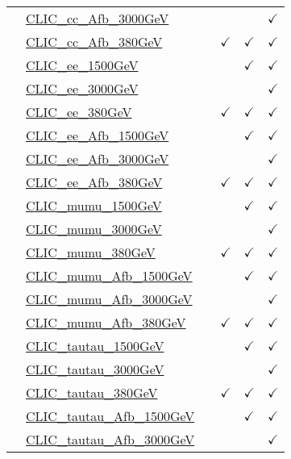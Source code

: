 \documentclass{article}
\begin{document}
\begin{longtable}{|c|l|c|c|c|c|}
 & \href{https://arxiv.org}{CLIC_cc_Afb_3000GeV}  &  &  &  & $\checkmark$\\ \cline{2-6}
 & \href{https://arxiv.org}{CLIC_cc_Afb_380GeV}  &  & $\checkmark$ & $\checkmark$ & $\checkmark$\\ \cline{2-6}
 & \href{https://arxiv.org}{CLIC_ee_1500GeV}  &  &  & $\checkmark$ & $\checkmark$\\ \cline{2-6}
 & \href{https://arxiv.org}{CLIC_ee_3000GeV}  &  &  &  & $\checkmark$\\ \cline{2-6}
 & \href{https://arxiv.org}{CLIC_ee_380GeV}  &  & $\checkmark$ & $\checkmark$ & $\checkmark$\\ \cline{2-6}
 & \href{https://arxiv.org}{CLIC_ee_Afb_1500GeV}  &  &  & $\checkmark$ & $\checkmark$\\ \cline{2-6}
 & \href{https://arxiv.org}{CLIC_ee_Afb_3000GeV}  &  &  &  & $\checkmark$\\ \cline{2-6}
 & \href{https://arxiv.org}{CLIC_ee_Afb_380GeV}  &  & $\checkmark$ & $\checkmark$ & $\checkmark$\\ \cline{2-6}
 & \href{https://arxiv.org}{CLIC_mumu_1500GeV}  &  &  & $\checkmark$ & $\checkmark$\\ \cline{2-6}
 & \href{https://arxiv.org}{CLIC_mumu_3000GeV}  &  &  &  & $\checkmark$\\ \cline{2-6}
 & \href{https://arxiv.org}{CLIC_mumu_380GeV}  &  & $\checkmark$ & $\checkmark$ & $\checkmark$\\ \cline{2-6}
 & \href{https://arxiv.org}{CLIC_mumu_Afb_1500GeV}  &  &  & $\checkmark$ & $\checkmark$\\ \cline{2-6}
 & \href{https://arxiv.org}{CLIC_mumu_Afb_3000GeV}  &  &  &  & $\checkmark$\\ \cline{2-6}
 & \href{https://arxiv.org}{CLIC_mumu_Afb_380GeV}  &  & $\checkmark$ & $\checkmark$ & $\checkmark$\\ \cline{2-6}
 & \href{https://arxiv.org}{CLIC_tautau_1500GeV}  &  &  & $\checkmark$ & $\checkmark$\\ \cline{2-6}
 & \href{https://arxiv.org}{CLIC_tautau_3000GeV}  &  &  &  & $\checkmark$\\ \cline{2-6}
 & \href{https://arxiv.org}{CLIC_tautau_380GeV}  &  & $\checkmark$ & $\checkmark$ & $\checkmark$\\ \cline{2-6}
 & \href{https://arxiv.org}{CLIC_tautau_Afb_1500GeV}  &  &  & $\checkmark$ & $\checkmark$\\ \cline{2-6}
 & \href{https://arxiv.org}{CLIC_tautau_Afb_3000GeV}  &  &  &  & $\checkmark$\\ \cline{2-6}

\end{longtable}
\end{document}

